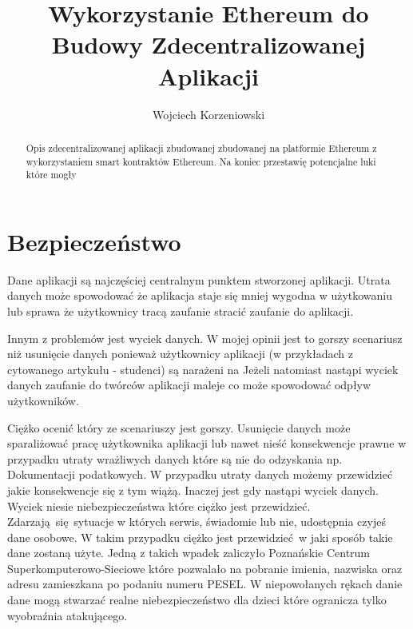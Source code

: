 \documentclass[]{llncs}
\begin{document}
\title{Wykorzystanie Ethereum do Budowy Zdecentralizowanej Aplikacji}
\author{Wojciech Korzeniowski}

\maketitle

\begin{abstract}

  Opis zdecentralizowanej aplikacji zbudowanej zbudowanej na platformie Ethereum
  z wykorzystaniem smart kontraktów Ethereum\cite{ethereum}. Na koniec przestawię
  potencjalne luki które mogły

\end{abstract}

\section{Bezpieczeństwo}

  Dane aplikacji są najczęściej centralnym punktem stworzonej aplikacji. Utrata
  danych może spowodować że aplikacja staje się mniej wygodna w
  użytkowaniu\cite{teatr-wspolczesny-utrata-danych} lub sprawa że użytkownicy
  tracą zaufanie stracić zaufanie do aplikacji\cite{nazwa-pl-utrata-danych}.

  Innym z problemów jest wyciek danych\cite{wyciek-danych-studentow}. W mojej
  opinii jest to gorszy scenariusz niż usunięcie danych ponieważ użytkownicy
  aplikacji (w przykładach z cytowanego artykułu - studenci) są narażeni na
  Jeżeli natomiast nastąpi wyciek danych zaufanie do twórców aplikacji maleje co
  może spowodować odpływ użytkowników.

  Ciężko ocenić który ze scenariuszy jest gorszy. Usunięcie danych może
  sparaliżować pracę użytkownika aplikacji lub nawet nieść konsekwencje prawne w
  przypadku utraty wrażliwych danych które są nie do odzyskania np. Dokumentacji
  podatkowych\cite{utrata-dokumentacji}. W przypadku utraty danych możemy
  przewidzieć jakie konsekwencje się z tym wiążą. Inaczej jest gdy nastąpi
  wyciek danych. Wyciek niesie niebezpieczeństwa które ciężko jest przewidzieć.
  Zdarzają się sytuacje w których serwis, świadomie lub nie, udostępnia czyjeś
  dane osobowe. W takim przypadku ciężko jest przewidzieć w jaki sposób takie
  dane zostaną użyte. Jedną z takich wpadek zaliczyło Poznańskie Centrum
  Superkomputerowo-Sieciowe które pozwalało na pobranie imienia, nazwiska oraz
  adresu zamieszkana po podaniu numeru PESEL\cite{dane-dzieci}. W niepowołanych
  rękach danie dane mogą stwarzać realne niebezpieczeństwo dla dzieci które
  ogranicza tylko wyobraźnia atakującego.
\end{document}
